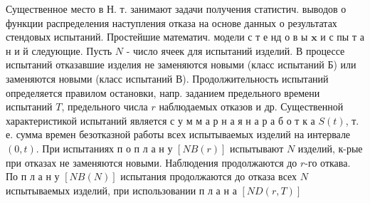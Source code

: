 \documentclass[10pt]{article}
\begin{document}
Существенное место в Н. т. занимают задачи получения статистич. выводов о функции распределения наступления отказа на основе данных о результатах стендовых испытаний. Простейшие математич. модели с т е нд о в ы $\mathbf{x}$ и с пы т а н и й следующие. Пусть $N$ - число ячеек для испытаний изделий. В процессе испытаний отказавшие изделия не заменяются новыми (класс испытаний Б) или заменяются новыми (класс испытаний В). Продолжительность испытаний определяется правилом остановки, напр. заданием предельного времени испытаний $T$, предельного числа $r$ наблюдаемых отказов и др. Существенной характеристикой испытаний является с у м м а р н а я н а р а б о т к а $S(t)$, т. е. сумма времен безотказной работы всех испытываемых изделий на интервале $(0, t)$. При испытаниях п о п л а н у $[N B(r)]$ испытывают $N$ изделий, к-рые при отказах не заменяются новыми. Наблюдения продолжаются до $r$-го откава. По п л а н у $[N B(N)]$ испытания продолжаются до отказа всех $N$ испытываемых изделий, при использовании п л а н а $[N D(r, T)]$
\end{document}
